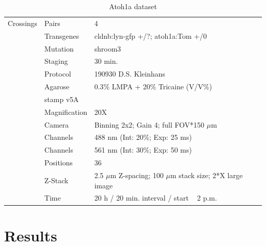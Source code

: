 \documentclass[11pt,singlespacinge,twoside]{reedthesis} %
\begin{document}
\begin{table}[!h]

\caption{\label{tab:imgdatato}Atoh1a dataset}
\centering
\begin{tabu} to 
\toprule
{}  Crossings & Pairs & 4\\
 & Transgenes & cldnb:lyn-gfp +/?; atoh1a:Tom +/0\\

   & Mutation & shroom3\\

 & Staging & 30 min.\\

   & Protocol & 190930 D.S. Kleinhans\\

 & Agarose & 0.3$\%$ LMPA + 20$\%$ Tricaine (V/V$\%$)\\

   & stamp v5A & \\

 & Magnification & 20X\\

   & Camera & Binning 2x2; Gain 4; full FOV*150 $\mu$m\\

 & Channels & 488 nm (Int: 20$\%$; Exp: 25 ms)\\

   & Channels & 561 nm (Int: 30$\%$; Exp: 50 ms)\\

 & Positions & 36\\

   & Z-Stack & 2.5 $\mu$m Z-spacing; 100 $\mu$m stack size; 2*X large image\\

 & Time & 20 h / 20 min. interval / start ~ 2 p.m.\\
\bottomrule
\end{tabu}
\end{table}
\hypertarget{res}{%
\chapter{Results}\label{res}}
\end{document}
